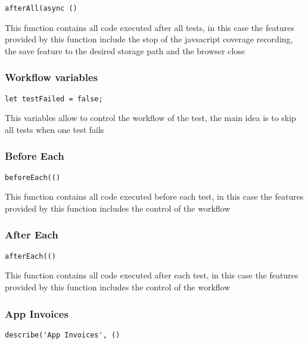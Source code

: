 \documentclass[a4paper]{article}
\begin{document}
\begin{lstlisting}
afterAll(async ()
\end{lstlisting}

This function contains all code executed after all tests, in this case the
features provided by this function include the stop of the javsacript coverage
recording, the save feature to the desired storage path and the browser close

\hypertarget{toc225}{}
\subsubsection{Workflow variables}

\begin{lstlisting}
let testFailed = false;
\end{lstlisting}

This variables allow to control the workflow of the test, the main idea is to
skip all tests when one test fails

\hypertarget{toc226}{}
\subsubsection{Before Each}

\begin{lstlisting}
beforeEach(()
\end{lstlisting}

This function contains all code executed before each test, in this case the
features provided by this function includes the control of the workflow

\hypertarget{toc227}{}
\subsubsection{After Each}

\begin{lstlisting}
afterEach(()
\end{lstlisting}

This function contains all code executed after each test, in this case the
features provided by this function includes the control of the workflow

\hypertarget{toc228}{}
\subsubsection{App Invoices}

\begin{lstlisting}
describe('App Invoices', ()
\end{lstlisting}
\end{document}

